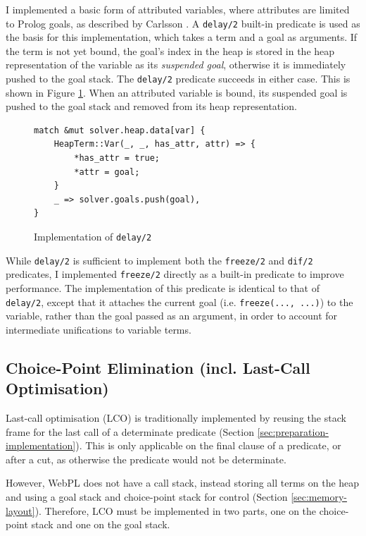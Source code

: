 I implemented a basic form of attributed variables, where attributes are limited to Prolog goals, as described by Carlsson \cite{carlssonimplementationdiffreeze1986}. A \texttt{delay/2} built-in predicate is used as the basis for this implementation, which takes a term and a goal as arguments. If the term is not yet bound, the goal's index in the heap is stored in the heap representation of the variable as its \emph{suspended goal}, otherwise it is immediately pushed to the goal stack. The \texttt{delay/2} predicate succeeds in either case. This is shown in Figure \ref{fig:delay-impl}. When an attributed variable is bound, its suspended goal is pushed to the goal stack and removed from its heap representation.

\begin{figure}[H]
\centering
\begin{verbatim}
match &mut solver.heap.data[var] {
    HeapTerm::Var(_, _, has_attr, attr) => {
        *has_attr = true;
        *attr = goal;
    }
    _ => solver.goals.push(goal),
}
\end{verbatim}
\caption{Implementation of \texttt{delay/2}}
\label{fig:delay-impl}
\end{figure}

While \texttt{delay/2} is sufficient to implement both the \texttt{freeze/2} and \texttt{dif/2} predicates, I implemented \texttt{freeze/2} directly as a built-in predicate to improve performance. The implementation of this predicate is identical to that of \texttt{delay/2}, except that it attaches the current goal (i.e. \texttt{freeze(..., ...)}) to the variable, rather than the goal passed as an argument, in order to account for intermediate unifications to variable terms.

\subsection{Choice-Point Elimination (incl. Last-Call Optimisation)}

\label{sec:choice-point-elimination}

Last-call optimisation (LCO) is traditionally implemented by reusing the stack frame for the last call of a determinate predicate (Section \ref{sec:preparation-implementation}). This is only applicable on the final clause of a predicate, or after a cut, as otherwise the predicate would not be determinate.

However, WebPL does not have a call stack, instead storing all terms on the heap and using a goal stack and choice-point stack for control (Section \ref{sec:memory-layout}). Therefore, LCO must be implemented in two parts, one on the choice-point stack and one on the goal stack.

